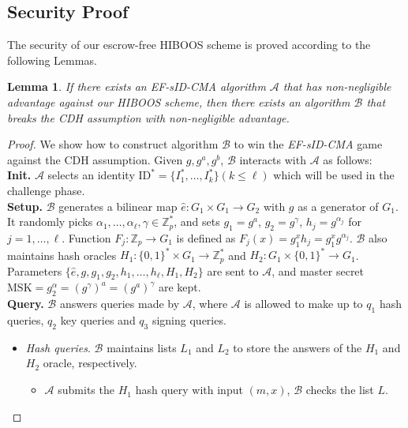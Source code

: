 \documentclass[times]{secauth}
\newtheorem{lemma}[theorem]{Lemma}
\theoremstyle{definition}
\theoremstyle{remark}
\begin{document}
\subsection{Security Proof}
The security of our escrow-free HIBOOS scheme is proved according to the following Lemmas. 
\begin{lemma} \label{lemma-ef-hibs}
If there exists an EF-sID-CMA algorithm $\mathcal{A}$ that has non-negligible advantage against our HIBOOS scheme, 
then there exists an algorithm $\mathcal{B}$ that breaks the CDH assumption with non-negligible advantage.
\end{lemma}
\begin{proof}
We show how to construct algorithm $\mathcal{B}$ to win the \emph{EF-sID-CMA} game against the CDH assumption. 
Given $g, g^a, g^b$, $\mathcal{B}$ interacts with $\mathcal{A}$ as follows:
\vspace{0.1cm}
\\
\textbf{Init.} 
$\mathcal{A}$ selects an identity $\mathrm{ID}^* = \{I^*_1, \ldots, I^*_k\} (k \leqslant \ell)$ which will be used in the challenge phase.  
\vspace{0.1cm}
\\
\textbf{Setup.} 
$\mathcal{B}$ generates a bilinear map $\hat{e}: G_1 \times G_1 \rightarrow G_2$ with $g$ as a generator of $G_1$.
It randomly picks $\alpha_1, \ldots, \alpha_\ell, \gamma \in \mathbb{Z}^*_p$, and sets $g_1 = g^a$, $g_2 = g^\gamma$, $h_j =g^{\alpha_j}$ for $j = 1, \ldots, \ell$.
Function $F_j : \mathbb{Z}_p \rightarrow G_1$ is defined as $F_j(x)=g_1^xh_j =g_1^xg^{\alpha_j}$.
$\mathcal{B}$ also maintains hash oracles $H_1: \{0, 1\}^* \times G_1 \rightarrow \mathbb{Z}_p^*$ and $H_2: G_1 \times \{0, 1\}^* \rightarrow G_1$.
Parameters $\{\hat{e}, g, g_1,  g_2, h_1, \ldots, h_\ell, H_1, H_2\}$ are sent to $\mathcal{A}$, and master secret $\mathrm{MSK} = g_2^\alpha = (g^{\gamma})^a = (g^a)^\gamma$ are kept.
\vspace{0.1cm}
\\
\textbf{Query.} $\mathcal{B}$ answers queries made by $\mathcal{A}$, where $\mathcal{A}$ is allowed to make up to $q_1$ hash queries, $q_2$ key queries and $q_3$ signing queries.
\begin{itemize}
	\item \emph{Hash queries}. 
	$\mathcal{B}$ maintains lists $L_1$ and $L_2$ to store the answers of the $H_1$ and $H_2$ oracle, respectively.
	\begin{itemize}
	\item $\mathcal{A}$ submits the $H_1$ hash query with input $(m, x)$, $\mathcal{B}$ checks the list $L$. 

\end{itemize}
\end{itemize}
\end{proof}
\end{document}
